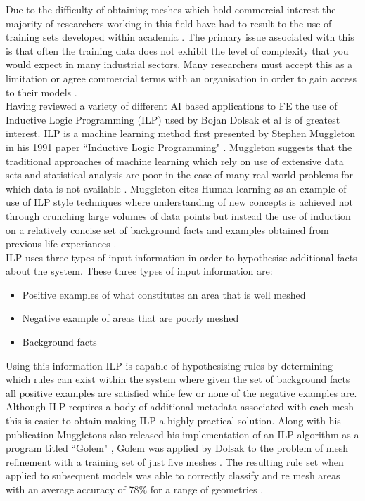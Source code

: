 \documentclass{article}
\begin{document}
\noindent
Due to the difficulty of obtaining meshes which hold commercial interest the majority of researchers working in this field have had to result to the use of training sets developed within academia \cite{DolsakPaper91}. The primary issue associated with this is that often the training data does not exhibit the level of complexity that you would expect in many industrial sectors. Many researchers must accept this as a limitation or agree commercial terms with an organisation in order to gain access to their models \cite{DittmerMeshQualityMet}.\\ 

\noindent
Having reviewed a variety of different AI based applications to FE the use of Inductive Logic Programming (ILP) used by Bojan Dolsak et al is of greatest interest. ILP is a machine learning method first presented by Stephen Muggleton in his 1991 paper ``Inductive Logic Programming" \cite{MuggletonILP}. Muggleton suggests that the traditional approaches of machine learning which rely on use of extensive data sets and statistical analysis are poor in the case of many real world problems for which data is not available \cite{ILPYoutubeLecture}. Muggleton cites Human learning as an example of use of ILP style techniques where understanding of new concepts is achieved not through crunching large volumes of data points but instead  the use of induction on a relatively concise set of background facts and examples obtained from previous life experiances \cite{ILPYoutubeLecture}. \\ 

\noindent
ILP uses three types of input information in order to hypothesise additional facts about the system. These three types of input information are: \\ 

\begin{itemize}
\item Positive examples  of what constitutes an area that is well meshed
\item Negative example of areas that are poorly meshed
\item Background facts
\end{itemize}

\noindent
Using this information ILP is capable of hypothesising rules by determining which rules can exist within the system where given the set of background facts all positive examples are satisfied while few or none of the negative examples are. Although ILP requires a body of additional metadata associated with each mesh this is easier to obtain making ILP a highly practical solution. Along with his publication Muggletons also released his implementation of an ILP algorithm as a program titled ``Golem" \cite{Golem}, Golem was applied by Dolsak to the problem of mesh refinement with a training set of just five meshes \cite{DolsakPaper94}. The resulting rule set when applied to subsequent models was able to correctly classify and re mesh areas with an average accuracy of 78\% for a range of geometries \cite{DolsakPaper94} \cite{appOfILPToFEMeshDesign}. \\
\end{document}
